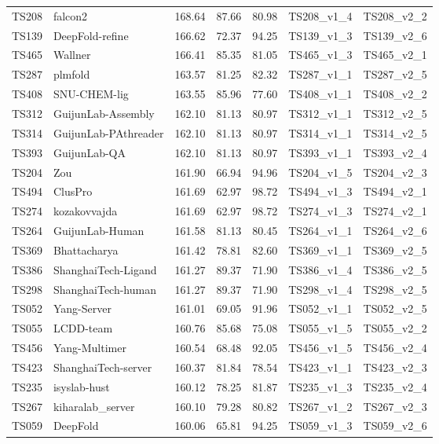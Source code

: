 \begin{longtable}{lllllll}
TS208 & falcon2 & 168.64 & 87.66 & 80.98 & TS208\_v1\_4 & TS208\_v2\_2 \\ 
TS139 & DeepFold-refine & 166.62 & 72.37 & 94.25 & TS139\_v1\_3 & TS139\_v2\_6 \\ 
TS465 & Wallner & 166.41 & 85.35 & 81.05 & TS465\_v1\_3 & TS465\_v2\_1 \\ 
TS287 & plmfold & 163.57 & 81.25 & 82.32 & TS287\_v1\_1 & TS287\_v2\_5 \\ 
TS408 & SNU-CHEM-lig & 163.55 & 85.96 & 77.60 & TS408\_v1\_1 & TS408\_v2\_2 \\ 
TS312 & GuijunLab-Assembly & 162.10 & 81.13 & 80.97 & TS312\_v1\_1 & TS312\_v2\_5 \\ 
TS314 & GuijunLab-PAthreader & 162.10 & 81.13 & 80.97 & TS314\_v1\_1 & TS314\_v2\_5 \\ 
TS393 & GuijunLab-QA & 162.10 & 81.13 & 80.97 & TS393\_v1\_1 & TS393\_v2\_4 \\ 
TS204 & Zou & 161.90 & 66.94 & 94.96 & TS204\_v1\_5 & TS204\_v2\_3 \\ 
TS494 & ClusPro & 161.69 & 62.97 & 98.72 & TS494\_v1\_3 & TS494\_v2\_1 \\ 
TS274 & kozakovvajda & 161.69 & 62.97 & 98.72 & TS274\_v1\_3 & TS274\_v2\_1 \\ 
TS264 & GuijunLab-Human & 161.58 & 81.13 & 80.45 & TS264\_v1\_1 & TS264\_v2\_6 \\ 
TS369 & Bhattacharya & 161.42 & 78.81 & 82.60 & TS369\_v1\_1 & TS369\_v2\_5 \\ 
TS386 & ShanghaiTech-Ligand & 161.27 & 89.37 & 71.90 & TS386\_v1\_4 & TS386\_v2\_5 \\ 
TS298 & ShanghaiTech-human & 161.27 & 89.37 & 71.90 & TS298\_v1\_4 & TS298\_v2\_5 \\ 
TS052 & Yang-Server & 161.01 & 69.05 & 91.96 & TS052\_v1\_1 & TS052\_v2\_5 \\ 
TS055 & LCDD-team & 160.76 & 85.68 & 75.08 & TS055\_v1\_5 & TS055\_v2\_2 \\ 
TS456 & Yang-Multimer & 160.54 & 68.48 & 92.05 & TS456\_v1\_5 & TS456\_v2\_4 \\ 
TS423 & ShanghaiTech-server & 160.37 & 81.84 & 78.54 & TS423\_v1\_1 & TS423\_v2\_3 \\ 
TS235 & isyslab-hust & 160.12 & 78.25 & 81.87 & TS235\_v1\_3 & TS235\_v2\_4 \\ 
TS267 & kiharalab\_server & 160.10 & 79.28 & 80.82 & TS267\_v1\_2 & TS267\_v2\_3 \\ 
TS059 & DeepFold & 160.06 & 65.81 & 94.25 & TS059\_v1\_3 & TS059\_v2\_6 \\ 

\end{longtable}
